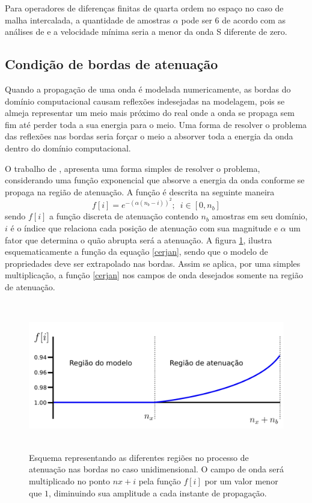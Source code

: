 \documentclass[
	12pt,				%
	openright,			%
	oneside,			%
	a4paper,			%
	english,			%
	brazil				%
	]{abntex2}
\begin{document}
 	Para operadores de diferenças finitas de quarta ordem no espaço no caso de malha intercalada, a quantidade de amostras $\alpha$ pode ser 6 de acordo com as análises de  e a velocidade mínima seria a menor da onda S diferente de zero.    

\subsection*{Condição de bordas de atenuação}
		
	Quando a propagação de uma onda é modelada numericamente, as bordas do domínio computacional causam reflexões indesejadas na modelagem, pois se almeja representar um meio mais próximo do real onde a onda se propaga sem fim até perder toda a sua energia para o meio. Uma forma de resolver o problema das reflexões nas bordas seria forçar o meio a absorver toda a energia da onda dentro do domínio computacional. 
	
	O trabalho de , apresenta uma forma simples de resolver o problema, considerando uma função exponencial que absorve a energia da onda conforme se propaga na região de atenuação. A função é descrita na seguinte maneira 
%	
	\begin{equation}
		f[i] = e^{-(\alpha(n_b - i))^2};\,\,\,  i \in [0,n_b]
		\label{cerjan}				
	\end{equation}  
%	
	\noindent sendo $f[i]$ a função discreta de atenuação contendo $n_b$ amostras em seu domínio, $i$ é o índice que relaciona cada posição de atenuação com sua magnitude e $\alpha$ um fator que determina o quão abrupta será a atenuação. A figura \ref{damping}, ilustra esquematicamente a função da equação \ref{cerjan}, sendo que o modelo de propriedades deve ser extrapolado nas bordas. Assim se aplica, por uma simples multiplicação, a função \ref{cerjan} nos campos de onda desejados somente na região de atenuação.
%	
    \begin{figure}[htp!]
		\centering
		\includegraphics[width=15cm,height=6.5cm]{../imagens/bordas.png}
		\caption{Esquema representando as diferentes regiões no processo de atenuação nas bordas no caso unidimensional. O campo de onda será multiplicado no ponto $nx+i$ pela função $f[i]$ por um valor menor que $1$, diminuindo sua amplitude a cada instante de propagação.}
		\label{damping}
	\end{figure}	 
%	
\end{document}
